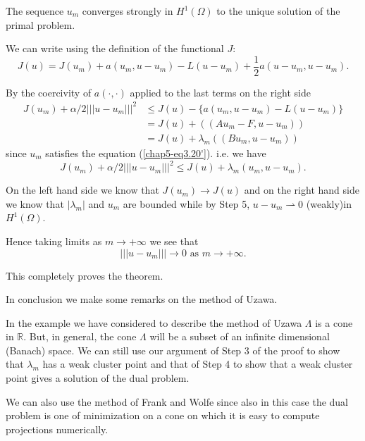 \begin{step}\label{chap5-step6}
 The sequence $u_{m}$ converges strongly in $H^{1}(\Omega)$ to the unique solution of the primal problem.

We can write using the definition of the functional $J$:
$$
J(u) = J(u_{m}) + a(u_{m}, u-u_{m}) - L(u-u_{m}) + \frac{1}{2} a(u-u_{m}, u-u_{m}).
$$

By the coercivity of $a(\cdot , \cdot)$ applied to the last terms on the right side 
\begin{align*}
J(u_{m}) + \alpha / 2 |||u-u_{m}|||^{2} & \leq J(u) - \{a(u_{m}, u-u_{m}) - L(u-u_{m}) \}\\
& = J(u) + ((Au_{m} - F, u-u_{m}))\\
& = J(u) + \lambda_{m} ((B u_{m}, u-u_{m}))
\end{align*}\pageoriginale
since $u_{m}$ satisfies the equation (\ref{chap5-eq3.20'}). i.e. we have
$$
J(u_{m}) + \alpha / 2 |||u-u_{m}|||^{2} \leq J(u) + \lambda_{m} (u_{m}, u-u_{m}).
$$

On the left hand side we know that $J(u_{m}) \to J(u)$ and on the right hand side we know that $|\lambda_{m}|$ and $u_{m}$ are bounded while by Step 5, $u - u_{m} \rightharpoonup 0$ (weakly)in $H^{1}(\Omega)$.

Hence taking limits as $m \to + \infty$ we see that
$$
||| u-u_{m} ||| \to 0 \text{ as } m \to + \infty.
$$
\end{step}

This completely proves the theorem.

In conclusion we make some remarks on the method of Uzawa.

\begin{remark}\label{chap5-rem3.3}
In the example we have considered to describe the method of Uzawa $\Lambda$ is a cone in $\mathbb{R}$. But, in general, the cone $\Lambda$ will be a subset of an infinite dimensional (Banach) space. We can still use our argument of Step 3 of the proof to show that $\lambda_{m}$ has a weak cluster point and that of Step 4 to show that a weak cluster point gives a solution of the dual problem.
\end{remark}

\begin{remark}\label{chap5-rem3.4}
We can also use the method of Frank and Wolfe since also in this case the dual problem is one of minimization on a cone on which it is easy to compute projections numerically.
\end{remark}

